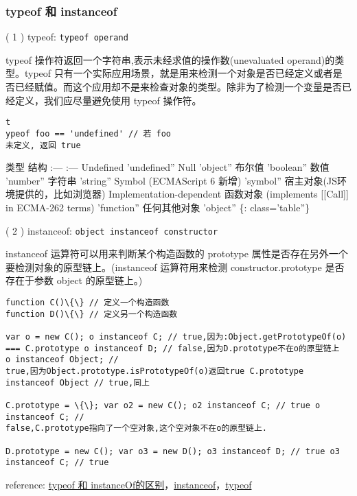 \subsubsection{typeof 和 instanceof}\label{typeof-ux548c-instanceof}

( 1 ) typeof: \texttt{typeof\ operand}

typeof 操作符返回一个字符串,表示未经求值的操作数(unevaluated
operand)的类型。typeof
只有一个实际应用场景，就是用来检测一个对象是否已经定义或者是否已经赋值。而这个应用却不是来检查对象的类型。除非为了检测一个变量是否已经定义，我们应尽量避免使用
typeof 操作符。

\begin{verbatim}t
ypeof foo == 'undefined' // 若 foo
未定义, 返回 true 
\end{verbatim}

类型 \textbar{} 结构 :--- \textbar{} :--- Undefined \textbar{}
'undefined'' Null \textbar{} 'object'' 布尔值 \textbar{} 'boolean''
数值 \textbar{} 'number'' 字符串 \textbar{} 'string'' Symbol
(ECMAScript 6 新增) \textbar{} 'symbol''
宿主对象(JS环境提供的，比如浏览器) \textbar{} Implementation-dependent
函数对象 (implements {[}{[}Call{]}{]} in ECMA-262 terms) \textbar{}
'function'' 任何其他对象 \textbar{} 'object'' \{: class='table''\}

( 2 ) instanceof: \texttt{object\ instanceof\ constructor}

instanceof 运算符可以用来判断某个构造函数的 prototype
属性是否存在另外一个要检测对象的原型链上。(instanceof 运算符用来检测
constructor.prototype 是否存在于参数 object 的原型链上。)

\begin{verbatim}function C()\{\} // 定义一个构造函数
function D()\{\} // 定义另一个构造函数

var o = new C(); o instanceof C; // true,因为:Object.getPrototypeOf(o)
=== C.prototype o instanceof D; // false,因为D.prototype不在o的原型链上
o instanceof Object; //
true,因为Object.prototype.isPrototypeOf(o)返回true C.prototype
instanceof Object // true,同上

C.prototype = \{\}; var o2 = new C(); o2 instanceof C; // true o
instanceof C; //
false,C.prototype指向了一个空对象,这个空对象不在o的原型链上.

D.prototype = new C(); var o3 = new D(); o3 instanceof D; // true o3
instanceof C; // true 
\end{verbatim}

reference: \href{http://segmentfault.com/a/1190000000730982}{typeof 和
instanceOf的区别}，\href{https://developer.mozilla.org/zh-CN/docs/Web/JavaScript/Reference/Operators/instanceof}{instanceof}，\href{https://developer.mozilla.org/zh-CN/docs/Web/JavaScript/Reference/Operators/typeof}{typeof}

